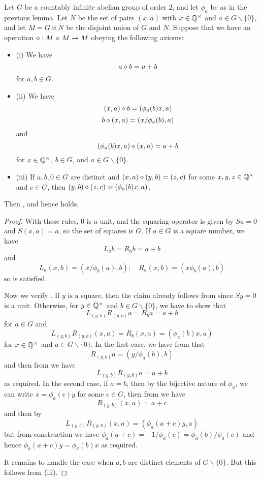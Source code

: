  \begin{lemma}\label{build-magma}  Let $G$ be a countably infinite abelian group of order $2$, and let $\phi_a$ be as in the previous lemma.  Let $N$ be the set of pairs $(x,a)$ with $x \in \mathbb{Q}^\times$ and $a \in G \backslash \{0\}$, and let $M = G \uplus N$ be the disjoint union of $G$ and $N$.  Suppose that we have an operation $\diamond : M \times M \to M$ obeying the following axioms:
\begin{itemize}
\item (i) We have
\begin{equation}\label{op-0}
  a \diamond b = a+b
\end{equation}
for $a,b \in G$.
\item (ii) We have
 \begin{equation}\label{op-1}
  (x,a) \diamond b = (\phi_a(b) x, a)
 \end{equation}
 \begin{equation}\label{op-2}
   b \diamond (x,a) = (x / \phi_a(b), a)
 \end{equation}
 and
 \begin{equation}\label{op-3}
   (\phi_a(b) x,a) \diamond (x,a) = a+b
 \end{equation}
 for $x \in \mathbb{Q}^\times$, $b \in G$, and $a \in G \backslash \{0\}$.
\item (iii) If $a,b,0 \in G$ are distinct and
$(x,a) \diamond (y,b) = (z,c)$ for some $x,y,z \in \mathbb{Q}^\times$ and $c \in G$, then $(y,b) \diamond (z,c) = (\phi_a(b) x,a)$.
\end{itemize}
Then ,  and hence  holds.
\end{lemma}

\begin{proof}
  With these rules, $0$ is a unit, and the squaring operator is given by $Sa = 0$ and $S(x,a) = a$, so the set of squares is $G$.  If $a \in G$ is a square number, we have
  $$ L_a b = R_a b = a+b$$
  and
  $$ L_a (x,b) = (x/\phi_b(a), b); \quad R_a (x,b) = (x \phi_b(a), b)$$
  so  is satisfied.

Now we verify .
If $y$ is a square, then the claim already follows from  since $Sy=0$ is a unit.  Otherwise, for $y \in \mathbb{Q}^\times$ and $b \in G \backslash \{0\}$, we have to show that
$$ L_{(y,b)} R_{(y,b)} a = R_b a = a+b$$
for $a \in G$ and
$$ L_{(y,b)} R_{(y,b)} (x,a) = R_b (x,a) = (\phi_a(b) x, a) $$
for $x \in \mathbb{Q}^\times$ and $a \in G \backslash \{0\}$.  In the first case, we have from  that
$$ R_{(y,b)} a = (y/\phi_a(b), b)$$
and then from  we have
$$L_{(y,b)} R_{(y,b)} a = a+b$$
as required.  In the second case, if $a=b$, then by the bijective nature of $\phi_a$, we can write $x = \phi_a(c) y$ for some $c \in G$, then from  we have
$$ R_{(y,b)} (x,a) = a+c$$
and then by 
$$ L_{(y,b)} R_{(y,b)} (x,a) = (\phi_a(a+c) y, a)$$
but from construction we have $\phi_a(a+c)=-1/\phi_a(c) = \phi_a(b)/\phi_a(c)$ and hence $\phi_a(a+c) y = \phi_a(b) x$ as required.

It remains to handle the case when $a,b$ are distinct elements of $G \backslash \{0\}$.  But this follows from (iii).
\end{proof}

